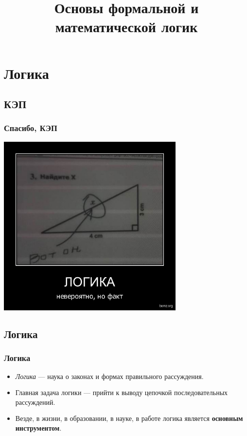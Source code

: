 \documentclass[compress,red]{beamer}
\title{Основы формальной и математической логик}
\begin{document}
\maketitle

\section{Логика}

\subsection{КЭП}
\begin{frame}[fragile]
  \frametitle{Спасибо, КЭП}
  \centerline{\includegraphics[width=0.7\textwidth]{images/logic.jpg}}
\end{frame}

\subsection{Логика}
\begin{frame}
  \frametitle{Логика}
  \begin{itemize}
    \item \emph{Логика} --- наука о законах и формах правильного рассуждения. 
    \item Главная задача логики --- прийти к выводу цепочкой последовательных рассуждений.
    \item Везде, в жизни, в образовании, в науке, в работе логика является \textbf{основным инструментом}.
  \end{itemize}
\end{frame}
\end{document}
